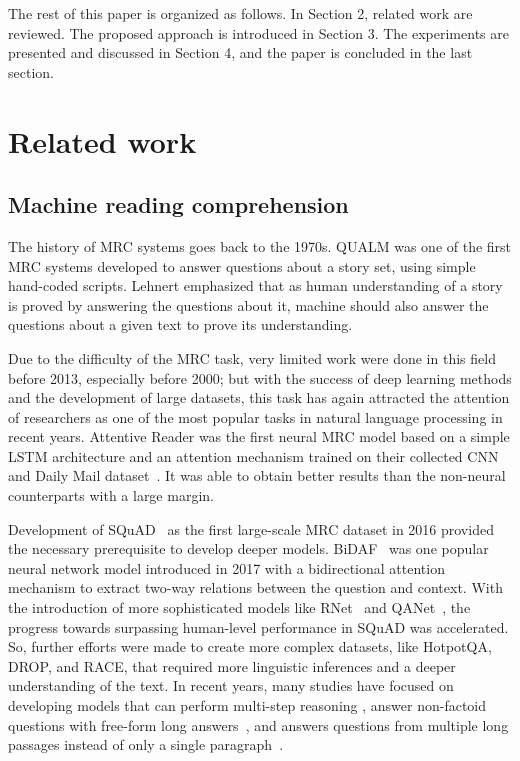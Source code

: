 \documentclass[review]{elsarticle}
\begin{document}
The rest of this paper is organized as follows. In Section 2, related work are reviewed. The proposed approach is introduced in Section 3. The experiments are presented and discussed in Section 4, and the paper is concluded in the last section.

\section{Related work}
\subsection{Machine reading comprehension}
The history of MRC systems goes back to the 1970s. QUALM \cite{lehnert1977process} was one of the first MRC systems developed to answer questions about a story set, using simple hand-coded scripts. Lehnert emphasized that as human understanding of a story is proved by answering the questions about it, machine should also answer the questions about a given text to prove its understanding.

Due to the difficulty of the MRC task, very limited work were done in this field before 2013, especially before 2000; but with the success of deep learning methods and the development of large datasets, this task has again attracted the attention of researchers as one of the most popular tasks in natural language processing in recent years.
Attentive Reader \cite{hermann2015teaching} was the first neural MRC model based on a simple LSTM architecture and an attention mechanism trained on their collected CNN and Daily Mail dataset~\cite{hermann2015teaching}. It was able to obtain better results than the non-neural counterparts with a large margin.

Development of SQuAD~\citep{RN22} as the first large-scale MRC dataset in 2016 provided the necessary prerequisite to develop deeper models. BiDAF~\citep{RN2} was one popular neural network model introduced in 2017 with a bidirectional attention mechanism to extract two-way relations between the question and context.
With the introduction of more sophisticated models like RNet~\citep{wang2017r} and QANet~\citep{RN50}, the progress towards surpassing human-level performance in SQuAD was accelerated. So, further efforts were made to create more complex datasets, like HotpotQA\citep{RN244}, DROP\citep{RN206}, and RACE\citep{lai2017race}, that required more linguistic inferences and a deeper understanding of the text. 
In recent years, many studies have focused on developing models that can perform multi-step reasoning \citep{ hu2018reinforced,gong2018ruminating,bauer2018commonsense,yan2019deep,ding2019cognitive,jin2020mmm,zhang2020read}, answer non-factoid questions with free-form long answers~\citep{bauer2018commonsense,tan2018s,nishida2019multi,zhang2020sg}, and answers questions from multiple long passages instead of only a single paragraph~\citep{ clark2018simple,tu2019multi,tu2020select,ren2020multi}.
\end{document}
